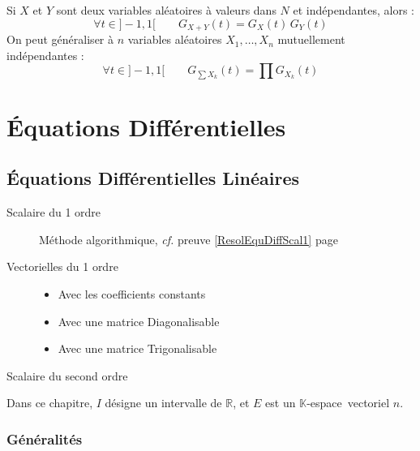 \documentclass[11pt,a4paper,fleqn,pdftex]{report}
\begin{document}
\begin{itheorem}
     Si $X$ et $Y$ sont deux variables aléatoires à valeurs dans $N$ et indépendantes, alors :
     \begin{equation}
     \boxed{\forall t\in ]-1,1[}\qquad G_{X+Y}(t) = G_X(t)\, G_Y(t)
     \end{equation}
     On peut généraliser à $n$ variables aléatoires $X_1,\ldots ,X_n$ mutuellement indépendantes : 
     \begin{equation}
     \boxed{\forall t\in ]-1,1[}\qquad G_{\sum X_k}(t) = \prod G_{X_k}(t)
     \end{equation}
\end{itheorem}
\part{Équations Différentielles}
\chapter{Équations Différentielles Linéaires}
\begin{methode}
\begin{description}
    \item[Scalaire du 1\ier{} ordre]
                Méthode algorithmique, \textit{cf.} preuve \ref{ResolEquDiffScal1} page \pageref{ResolEquDiffScal1}
    \item[Vectorielles du 1\ier{} ordre] \hfill
    \begin{itemize}\itemsep2pt %
                    \item Avec les coefficients constants
                    \item Avec une matrice Diagonalisable
                    \item Avec une matrice Trigonalisable
    \end{itemize}

    \item[Scalaire du second ordre]
\end{description}

\end{methode}
Dans ce chapitre, $I$ désigne un intervalle de $\mathbb{R}$, et $E$ est un $\mathbb{K}$-espace~vectoriel  $n$.
\section{Généralités} %
\label{sec:ED_generalites}
\end{document}
